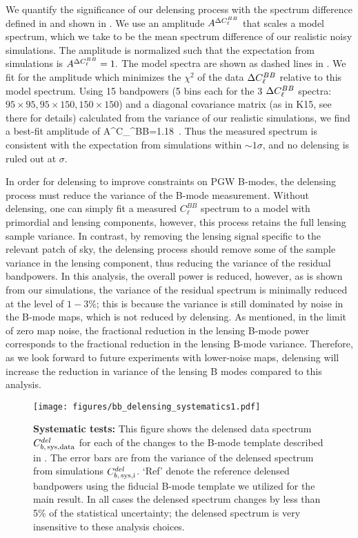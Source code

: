We quantify the significance of our delensing process with the spectrum difference \Dclbb defined in  and shown in .
We use an amplitude $A^{\Delta C_{\ell}^{BB}}$ that scales a model \Dclbb spectrum, which we take to be the mean spectrum difference of our realistic noisy simulations.
The amplitude is normalized such that the expectation from simulations is $A^{\Delta C_{\ell}^{BB}}=1.$
The model spectra are shown as dashed lines in .
We fit for the amplitude which minimizes the $\chi^2$ of the data $\Delta C_{\ell}^{BB}$ relative to this model spectrum.
Using 15 bandpowers (5 bins each for the 3 $\Delta C_{\ell}^{BB}$ spectra: $95\times 95,95\times 150, 150\times 150$) and a diagonal covariance matrix (as in K15, see there for details) calculated from the variance of our realistic simulations, we find a best-fit amplitude of
\beq
  \label{eqn:Dclbb_data}
  A^{\Delta C_{\ell}^{BB}}=1.18 \,.
\eeq
Thus the measured \Dclbb spectrum is consistent with the expectation from simulations within $\sim 1\sigma$, and no delensing is ruled out at
\delSignificance$\sigma$.

In order for delensing to improve constraints on PGW B-modes, the delensing process must reduce the variance of the B-mode measurement.
Without delensing, one can simply fit a measured $C_{\ell}^{BB}$ spectrum to a model with primordial and lensing components, however, this process retains the full lensing sample variance.
In contrast, by removing the lensing signal specific to the relevant patch of sky, the delensing process should remove some of the sample variance in the lensing component, thus reducing the variance of the residual bandpowers.
In this analysis, the overall power is reduced, however, as is shown from our simulations, the variance of the residual spectrum is minimally reduced at the level of {$1-3\%$};
this is because the variance is still dominated by noise in the B-mode maps, which is not reduced by delensing.
As mentioned, in the limit of zero map noise, the fractional reduction in the lensing B-mode power corresponds to the fractional reduction in the lensing B-mode variance.
Therefore, as we look forward to future experiments with lower-noise maps, delensing will increase the reduction in variance of the lensing B modes compared to this analysis.

\begin{figure}
\begin{center}
\texttt{[image: figures/bb\_delensing\_systematics1.pdf]}
\caption{\textbf{Systematic tests:}
 This figure shows the delensed data spectrum $C^{del}_{b,\,{\rm sys, data}}$ for each of the changes to the B-mode template described in .
 The error bars are from the variance of the delensed spectrum from simulations $C^{del}_{b,\,{\rm sys, i}}$.
 `Ref' denote the reference delensed bandpowers using the fiducial B-mode template we utilized for the main result.
 In all cases the delensed spectrum changes by less than 5\% of the statistical uncertainty; the delensed spectrum is very insensitive to these analysis choices.
 }
\label{fig:sys}
\end{center}
\end{figure}



